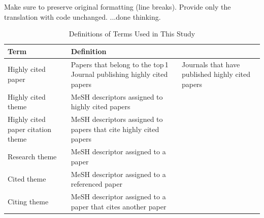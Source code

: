 Make sure to preserve original formatting (line breaks). Provide only the translation with code unchanged.
...done thinking.

\begin{table}[h] 
\begin{center} 
\caption{Definitions of Terms Used in This Study} 
\label{tab:def} 
{\small 
\begin{tabular}{lp{32mm}} 
Term & Definition \\ 
\hline 
Highly cited paper & Papers that belong to the top 1 %
Journal publishing highly cited papers & Journals that have published highly cited papers \\ 
Highly cited theme & MeSH descriptors assigned to highly cited papers \\ 
Highly cited paper citation theme & MeSH descriptors assigned to papers that cite highly cited papers \\ 
Research theme & MeSH descriptor assigned to a paper \\ 
Cited theme & MeSH descriptor assigned to a referenced paper \\ 
Citing theme & MeSH descriptor assigned to a paper that cites another paper \\ 
\end{tabular} 
} 
\end{center} 
\end{table}


